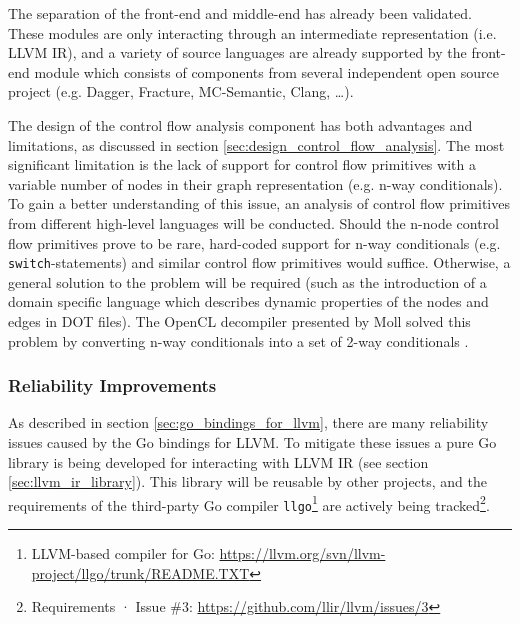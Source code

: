 The separation of the front-end and middle-end has already been validated. These modules are only interacting through an intermediate representation (i.e. LLVM IR), and a variety of source languages are already supported by the front-end module which consists of components from several independent open source project (e.g. Dagger, Fracture, MC-Semantic, Clang, …).

The design of the control flow analysis component has both advantages and limitations, as discussed in section \ref{sec:design_control_flow_analysis}. The most significant limitation is the lack of support for control flow primitives with a variable number of nodes in their graph representation (e.g. n-way conditionals). To gain a better understanding of this issue, an analysis of control flow primitives from different high-level languages will be conducted. Should the n-node control flow primitives prove to be rare, hard-coded support for n-way conditionals (e.g. \texttt{switch}-statements) and similar control flow primitives would suffice. Otherwise, a general solution to the problem will be required (such as the introduction of a domain specific language which describes dynamic properties of the nodes and edges in DOT files). The OpenCL decompiler presented by Moll solved this problem by converting n-way conditionals into a set of 2-way conditionals \cite{decomp_of_llvm}.


\subsubsection{Reliability Improvements}

As described in section \ref{sec:go_bindings_for_llvm}, there are many reliability issues caused by the Go bindings for LLVM. To mitigate these issues a pure Go library is being developed for interacting with LLVM IR (see section \ref{sec:llvm_ir_library}). This library will be reusable by other projects, and the requirements of the third-party Go compiler \texttt{llgo}\footnote{LLVM-based compiler for Go: \url{https://llvm.org/svn/llvm-project/llgo/trunk/README.TXT}} are actively being tracked\footnote{Requirements · Issue \#3: \url{https://github.com/llir/llvm/issues/3}}.

